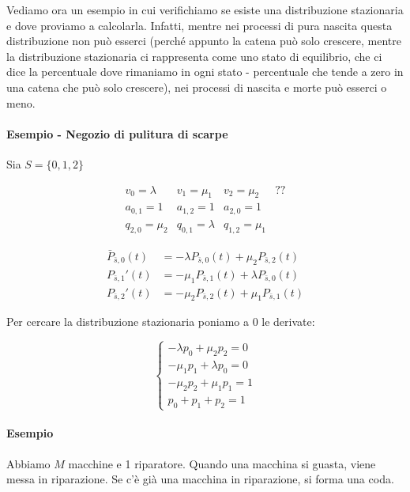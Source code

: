 \documentclass[a4paper,12pt]{book}
\begin{document}
Vediamo ora un esempio in cui verifichiamo se esiste una distribuzione stazionaria e dove proviamo a calcolarla. Infatti, mentre nei processi di pura nascita questa distribuzione non può esserci (perché appunto la catena può solo crescere, mentre la distribuzione stazionaria ci rappresenta come uno stato di equilibrio, che ci dice la percentuale dove rimaniamo in ogni stato - percentuale che tende a zero in una catena che può solo crescere), nei processi di nascita e morte può esserci o meno. 

\paragraph{Esempio - Negozio di pulitura di scarpe} Sia $ S = \{0,1,2\} $

$$ \begin{array}{cccc}
	v_0 = \lambda & v_1 = \mu_1 & v_2 = \mu_2 & ?? \\
	a_{0,1} = 1 & a_{1,2} = 1 & a_{2,0} = 1 \\
	q_{2,0} = \mu_2 & q_{0,1} = \lambda & q_{1,2} = \mu_1
\end{array} $$

\begin{align*}
	\bar{P}_{\bar{s},0}(t) & = -\lambda P_{\bar{s}, 0}(t) + \mu_2 P_{\bar{s},2}(t) \\
	{P}_{\bar{s},1}'(t) & = -\mu_1 P_{\bar{s}, 1}(t) + \lambda P_{\bar{s},0}(t) \\
	{P}_{\bar{s},2}'(t) & = -\mu_2 P_{\bar{s}, 2}(t) + \mu_1 P_{\bar{s},1}(t)
\end{align*}

Per cercare la distribuzione stazionaria poniamo a 0 le derivate:

$$ 
	\begin{cases}
		-\lambda p_0 + \mu_2 p_2 = 0 \\
		-\mu_1 p_1 + \lambda p_0 = 0 \\
		-\mu_2 p_2 + \mu_1 p_1 = 1 \\
		p_0 + p_1 + p_2 = 1
	\end{cases}
$$



\paragraph{Esempio}

Abbiamo $ M $ macchine e 1 riparatore. Quando una macchina si guasta, viene messa in riparazione. Se c'è già una macchina in riparazione, si forma una coda. 
\end{document}
